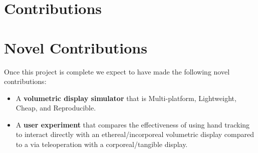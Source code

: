 \section{Contributions}
\section{Novel Contributions}
Once this project is complete we expect to have made the following novel contributions:
\begin{itemize}
    \item A \textbf{volumetric display simulator} that is Multi-platform, Lightweight, Cheap, and Reproducible.
    \item A \textbf{user experiment} that compares the effectiveness of using hand tracking to interact directly with an ethereal/incorporeal volumetric display compared to a via teleoperation with a corporeal/tangible display.
\end{itemize}